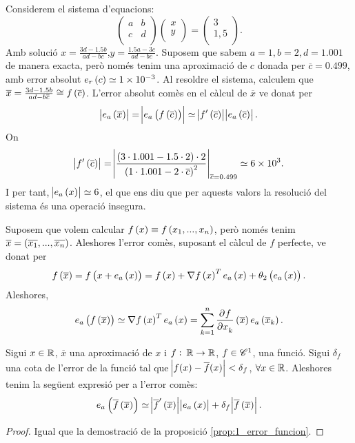 \begin{example}
      
    Considerem el sistema d'equacions:
    \[
	\begin{pmatrix}
	    a & b\\
	    c & d\\
	\end{pmatrix}
	\begin{pmatrix}
	x\\
	y\\
	\end{pmatrix} =
	\begin{pmatrix}
	3\\
	1,5\\
	\end{pmatrix}.
    \]
    Amb solució $x = \frac{3d-1.5b}{ad-bc}$,$y = \frac{1.5a-3c}{ad-bc}$. Suposem que sabem $a = 1,b = 2,d = 1.001$ de manera exacta, però només tenim una aproximació de $c$ donada per $\overline{c} = 0.499$, amb error absolut $e_r\left( c\right)  \simeq \SI{1e-3}{}$. Al resoldre el sistema, calculem que $\overline{x} = \frac{3d-1.5b}{ad-b\overline{c}} \cong f\left( \overline{c}\right) $. L'error absolut comès en el càlcul de $\overline{x}$ ve donat per
    \[
	    \abs{e_a\left( \overline{x}\right)} = \abs{e_a\left( f\left( \overline{c}\right) \right)} \simeq \abs{f'\left( \overline{c}\right)}\abs{e_a\left( \overline{c}\right)}.
    \]
    On
    \[
	    \abs{f'\left( \overline{c}\right)}= \abs{\frac{\left( 3\cdot 1.001-1.5\cdot 2\right) \cdot 2}{\left( 1\cdot 1.001 -2\cdot\overline{c}\right) ^2}}_{\overline{c}=0.499} \simeq \SI{6e3}{}.
    \]
    I per tant, $\abs{e_a\left( x\right)}\simeq 6$, el que ens diu que per aquests valors la resolució del sistema és una operació insegura.
\end{example}

\begin{obs}
      Suposem que volem calcular $f\left( x\right)  \equiv f\left( x_1,...,x_n\right) $, però només tenim $\overline{x} = \left( \overline{x_1},...,\overline{x_n}\right) $. Aleshores l'error comès, suposant el càlcul de $f$ perfecte, ve donat per
      \[
	      f\left( \overline{x}\right)  = f\left( x + e_a\left( x\right) \right)  = f\left( x\right)  + \nabla f\left( x\right)^Te_a\left( x\right)  + \theta_2\left( e_a\left( x\right) \right).
      \]
      Aleshores,
      \[
	      e_a\left( f\left( \overline{x}\right) \right)  \simeq \nabla f\left( x\right) ^Te_a\left( x\right)  = \sum_{k=1}^{n}\frac{\partial^{} f}{\partial x_k^{}} \left( \overline{x}\right) e_a\left( \overline{x}_k\right).
      \]
\end{obs}

\begin{prop}
  Sigui $x \in \mathbb{R}$, $\overline{x}$ una aproximació de $x$ i $f:\: \mathbb{R} \to \mathbb{R}$, $f\in \mathscr{C}^1$, una funció. Sigui $\delta_f$ una cota de l'error de la funció tal que $\abs{f(x)-\overline{f}(x)}<\delta_f$, $\forall x \in \mathbb{R}$. Aleshores tenim la següent expresió per a l'error comès:
  \[
      e_a\left( \overline{f}\left( \overline{x}\right) \right)  \simeq \abs{\overline{f}'\left( \overline{x}\right) }\abs{e_a\left( x\right)} + \delta_f\abs{\overline{f}\left( \overline{x}\right)}.
  \]
\end{prop}
\begin{proof}
  Igual que la demostració de la proposició \ref{prop:1_error_funcion}.
\end{proof}

